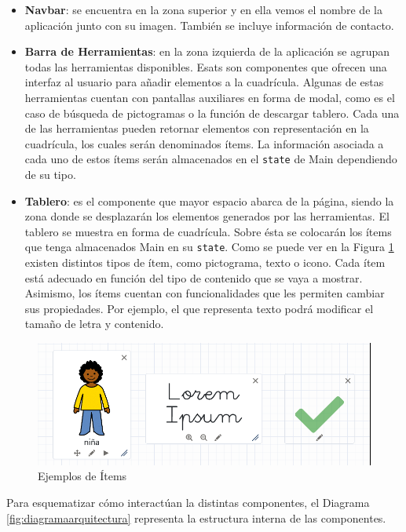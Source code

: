 \begin{itemize}
	\item \textbf{Navbar}: se encuentra en la zona superior y en ella vemos el nombre de la aplicación junto con su imagen. También se incluye información de contacto.
	
	
	\item \textbf{Barra de Herramientas}: en la zona izquierda de la aplicación se agrupan todas las herramientas disponibles. 
	Esats son componentes que ofrecen una interfaz al usuario para añadir elementos a la cuadrícula. Algunas de estas herramientas cuentan con pantallas auxiliares en forma de modal, como es el caso de búsqueda de pictogramas o la función de descargar tablero. Cada una de las herramientas pueden retornar elementos con representación en la cuadrícula, los cuales serán denominados ítems. La información asociada a cada uno de estos ítems serán almacenados en el \texttt{state} de Main dependiendo de su tipo.
	
	\item \textbf{Tablero}: es el componente que mayor espacio abarca de la página, siendo la zona donde se desplazarán los elementos generados por las herramientas. El tablero se muestra en forma de cuadrícula. Sobre ésta se colocarán los ítems que tenga almacenados Main en su \texttt{state}.  Como se puede ver en la Figura \ref{fig:items} existen distintos tipos de ítem, como pictograma, texto o icono. Cada ítem está adecuado en función del tipo de contenido que se vaya a mostrar. Asimismo, los ítems cuentan con funcionalidades que les permiten cambiar sus propiedades. Por ejemplo, el que representa texto podrá modificar el tamaño de letra y contenido.  
	
\end{itemize}


	

\begin{figure}[h!]
	\centering
	\includegraphics[width=0.7\linewidth]{Imagenes/Bitmap/items}
	\caption{Ejemplos de Ítems}
	\label{fig:items}
\end{figure}
	

Para esquematizar cómo interactúan la distintas componentes, el Diagrama \ref{fig:diagramaarquitectura} representa la estructura interna de las componentes.

